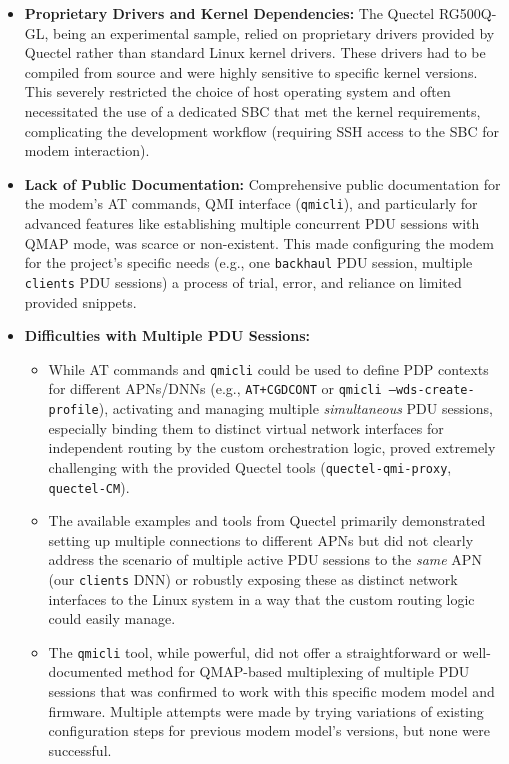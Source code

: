 \begin{itemize}
    \item \textbf{Proprietary Drivers and Kernel Dependencies:} The Quectel RG500Q-GL, being an experimental sample, relied on proprietary drivers provided by Quectel rather than standard Linux kernel drivers. These drivers had to be compiled from source and were highly sensitive to specific kernel versions. This severely restricted the choice of host operating system and often necessitated the use of a dedicated \ac{SBC} that met the kernel requirements, complicating the development workflow (requiring \ac{SSH} access to the \ac{SBC} for modem interaction).

    \item \textbf{Lack of Public Documentation:} Comprehensive public documentation for the modem's \ac{AT} commands, \ac{QMI} interface (\texttt{qmicli}), and particularly for advanced features like establishing multiple concurrent \ac{PDU} sessions with \ac{QMAP} mode, was scarce or non-existent. This made configuring the modem for the project's specific needs (e.g., one \texttt{backhaul} \ac{PDU} session, multiple \texttt{clients} \ac{PDU} sessions) a process of trial, error, and reliance on limited provided snippets.

    \item{
        \textbf{Difficulties with Multiple \ac{PDU} Sessions:}
        \begin{itemize}
            \item While \ac{AT} commands and \texttt{qmicli} could be used to define \ac{PDP} contexts for different \acp{APN}/\acp{DNN} (e.g., \texttt{AT+CGDCONT} or \texttt{qmicli --wds-create-profile}), activating and managing multiple \textit{simultaneous} \ac{PDU} sessions, especially binding them to distinct virtual network interfaces for independent routing by the custom orchestration logic, proved extremely challenging with the provided Quectel tools (\texttt{quectel-qmi-proxy}, \texttt{quectel-CM}).

            \item The available examples and tools from Quectel primarily demonstrated setting up multiple connections to different \acp{APN} but did not clearly address the scenario of multiple active \ac{PDU} sessions to the \textit{same} \ac{APN} (our \texttt{clients} \ac{DNN}) or robustly exposing these as distinct network interfaces to the Linux system in a way that the custom routing logic could easily manage.

            \item The \texttt{qmicli} tool, while powerful, did not offer a straightforward or well-documented method for \ac{QMAP}-based multiplexing of multiple \ac{PDU} sessions that was confirmed to work with this specific modem model and firmware. Multiple attempts were made by trying variations of existing configuration steps for previous modem model's versions, but none were successful.
        \end{itemize}
    }


\end{itemize}
